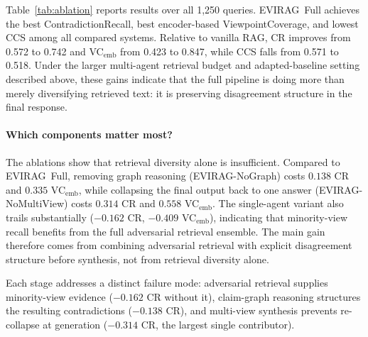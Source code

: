 \documentclass[11pt]{article}
\newcommand{\system}{\textsc{EVIRAG}\xspace}
\begin{document}
\begin{table}[t]
\centering\small
\setlength{\tabcolsep}{3pt}
\caption{Ablation deltas relative to \system\ Full.  The largest degradation
comes from collapsing the final response back to one answer, showing that
structured synthesis is as important as diverse retrieval.}
\label{tab:components}
\end{table}

Table~\ref{tab:ablation} reports results over all 1,250 queries.  \system\ Full
achieves the best ContradictionRecall, best encoder-based
ViewpointCoverage, and lowest CCS among all compared systems.  Relative to
vanilla RAG, CR improves from 0.572 to 0.742 and VC$_\text{emb}$ from 0.423 to
0.847, while CCS falls from 0.571 to 0.518.  Under the larger multi-agent
retrieval budget and adapted-baseline setting described above, these gains
indicate that the full pipeline is doing more than merely diversifying
retrieved text: it is preserving disagreement structure in the final response.

\paragraph{Which components matter most?}
The ablations show that retrieval diversity alone is insufficient.  Compared to
\system\ Full, removing graph reasoning (\system-NoGraph) costs $0.138$ CR and
$0.335$ VC$_\text{emb}$, while collapsing the final output back to one answer
(\system-NoMultiView) costs $0.314$ CR and $0.558$ VC$_\text{emb}$.  The
single-agent variant also trails substantially ($-0.162$ CR,
$-0.409$ VC$_\text{emb}$), indicating that minority-view recall benefits from
the full adversarial retrieval ensemble.  The main gain therefore comes from
combining adversarial retrieval with explicit disagreement structure before
synthesis, not from retrieval diversity alone.

Each stage addresses a distinct failure mode: adversarial retrieval
supplies minority-view evidence ($-0.162$ CR without it), claim-graph
reasoning structures the resulting contradictions ($-0.138$ CR), and
multi-view synthesis prevents re-collapse at generation ($-0.314$ CR,
the largest single contributor).
\end{document}

